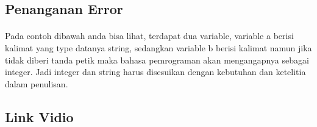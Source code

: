 \documentclass{article}
\begin{document}
    \subsection{Penanganan Error}
        \paragraph{}Pada contoh dibawah anda bisa lihat, terdapat dua variable, variable a berisi kalimat yang type datanya string, sedangkan variable b berisi kalimat namun jika tidak diberi tanda petik maka bahasa pemrograman akan mengangapnya sebagai integer. Jadi integer dan string harus disesuikan dengan kebutuhan dan ketelitia dalam penulisan.
            
            
    \subsection{Link Vidio}
        \paragraph{}
    
\end{document}
